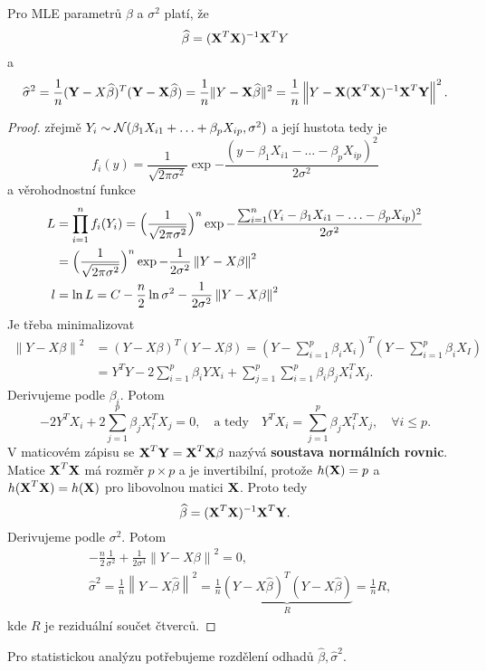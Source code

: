 \begin{theorem}
Pro MLE parametrů $\beta$ a $\sigma^2$ platí, že
$$\widehat{\beta}=(\textbf{X}^T\textbf{X})^{-1}\textbf{X}^TY $$
a
$$\widehat{\sigma}^2=\frac{1}{n}(\textbf{Y}-X\widehat{\beta})^T(\textbf{Y}-\textbf{X}\widehat{\beta})=\frac{1}{n}\|Y-\textbf{X}\widehat{\beta} \|^2=\frac{1}{n}\left\|Y-\textbf{X}(\textbf{X}^T\textbf{X})^{-1}\textbf{X}^T\textbf{Y} \right\|^2. $$
\begin{proof}
zřejmě $Y_i\sim \mathcal{N}(\beta_1X_{i1}+\ldots+\beta_pX_{ip}  ,\sigma^2)$ a její hustota tedy je
$$f_i(y)=\frac{1}{\sqrt{2\pi \sigma^2}}\exp{-\frac{(y-\beta_1X_{i1}-\ldots-\beta_pX_{ip})^2}{2\sigma^2}} $$
a věrohodnostní funkce
\begin{align*}
L&=\prod_{i=1}^{n}f_i(Y_i)=\Bigl(\frac{1}{\sqrt{2\pi \sigma^2}}\Bigr)^n\exp{-\frac{\sum_{i=1}^{n}(Y_i-\beta_1X_{i1}-\ldots-\beta_pX_{ip})^2}{2\sigma^2}}\\
&=\Bigl(\frac{1}{\sqrt{2\pi \sigma^2}}\Bigr)^n \exp{-\frac{1}{2\sigma^2}\left\|Y-X\beta \right\|^2}\\
l&=\ln L=C-\frac{n}{2}\ln{\sigma^2}-\frac{1}{2\sigma^2}\left\|Y-X\beta\right\|^2
\end{align*}
Je třeba minimalizovat 
\begin{align*}
\left\|Y-X\beta\right\|^2&=(Y-X\beta)^T(Y-X\beta)=(Y-\sum_{i=1}^{p}\beta_iX_i)^T(Y-\sum_{i=1}^{p}\beta_iX_I)\\
&=Y^TY-2\sum_{i=1}^{p}\beta_iYX_i+\sum_{j=1}^{p}\sum_{i=1}^{p}\beta_i\beta_jX_i^TX_j. 
\end{align*}
Derivujeme podle $\beta_i$. Potom
$$-2Y^TX_i+2\sum_{j=1}^{p}\beta_jX_i^TX_j=0,\quad\text{a tedy}\quad Y^TX_i=\sum_{j=1}^{p}\beta_jX_i^TX_j, \quad \forall i \leq p.$$
V maticovém zápisu se 
$\textbf{X}^T\textbf{Y}=\textbf{X}^T\textbf{X}\beta$ nazývá \textbf{soustava normálních rovnic}. Matice $\textbf{X}^T\textbf{X}$ má rozměr $p\times p$ a je invertibilní, protože $h(\textbf{X})=p$ a $h(\textbf{X}^T\textbf{X})=h(\textbf{X})$ pro libovolnou matici $\textbf{X}$. Proto tedy
$$\widehat{\beta}=(\textbf{X}^T\textbf{X})^{-1}\textbf{X}^T\textbf{Y}.$$
Derivujeme podle $\sigma^2$. Potom
\begin{align*}
&-\frac{n}{2}\frac{1}{\sigma^2}+\frac{1}{2\sigma^4}\left\|Y-X\beta\right\|^2=0,\\
&\widehat{\sigma}^2=\frac{1}{n}\left\|Y-X\widehat{\beta} \right\|^2=\frac{1}{n}\underbrace{(Y-X\widehat{\beta})^T(Y-X\widehat{\beta})}_{R}=\frac{1}{n}R,
\end{align*}
kde $R$ je reziduální součet čtverců.
\end{proof}
\end{theorem}
Pro statistickou analýzu potřebujeme rozdělení odhadů $\widehat{\beta}, \widehat{\sigma}^2$.

